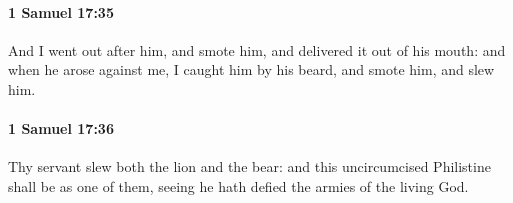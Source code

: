 		\paragraph{1 Samuel 17:35} %
			\label{1SAMUEL-17-35}

			And I went out after him, and smote him, and delivered it out of his mouth: and when he arose against me, I caught him by his beard, and smote him, and slew him.


		\paragraph{1 Samuel 17:36} %
			\label{1SAMUEL-17-36}

			Thy servant slew both the lion and the bear: and this uncircumcised Philistine shall be as one of them, seeing he hath defied the armies of the living God.


